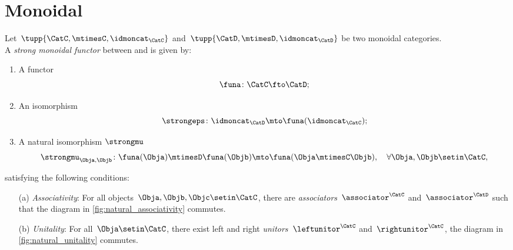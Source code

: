 
\section{Monoidal }
\label{sec:monoidal-functors}
\begin{ctdefinition}
    \label{def:strong-monoidal-functor}
    Let~$\tupp{\CatC,\mtimesC,\idmoncat_{\CatC}}$ and~$\tupp{\CatD,\mtimesD,\idmoncat_{\CatD}}$ be two monoidal categories.
    \\
    A \emph{strong monoidal functor} between \CatC and \CatD is given by:
    \begin{enumerate}
        \item A functor
              \begin{equation}
                  \funa \colon \CatC \fto \CatD;
              \end{equation}
        \item An isomorphism
              \begin{equation}
                  \strongeps\colon \idmoncat_{\CatD}\mto \funa(\idmoncat_{\CatC});
              \end{equation}
        \item A natural isomorphism $\strongmu$
              \begin{equation}
                  \strongmu_{\Obja,\Objb}\colon \funa(\Obja)\mtimesD \funa(\Objb) \mto \funa(\Obja \mtimesC \Objb),\quad \forall \Obja,\Objb\setin \CatC,
              \end{equation}
    \end{enumerate}
    satisfying the following conditions:
    \begin{enumerate}
        \item[(a)] \emph{Associativity}: For all objects~$\Obja,\Objb,\Objc\setin \CatC$, there are  \emph{associators}~$\associator^\CatC$ and~$\associator^\CatD$ such that the diagram in \cref{fig:natural_associativity} commutes.
        \item[(b)] \emph{Unitality}: For all~$\Obja\setin \CatC$, there exist left and right \emph{unitors}~$\leftunitor^\CatC$ and~$\rightunitor^\CatC$, the diagram in
            \cref{fig:natural_unitality} commutes.
    \end{enumerate}
\end{ctdefinition}
